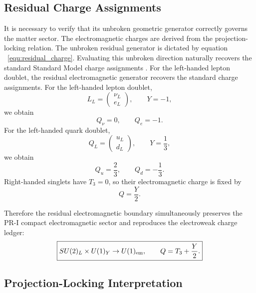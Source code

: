 \documentclass[11pt]{article}
\begin{document}
\subsection{Residual Charge Assignments}
\label{sec:pr2_residual_charge_assignments}
It is necessary to verify that its unbroken geometric generator correctly governs the matter sector. The electromagnetic charges are derived from the projection-locking relation. The unbroken residual generator is dictated by equation ~\ref{equ:residual_charge}. Evaluating this unbroken direction naturally recovers the standard Standard Model charge assignments \cite{PDG2024}. For the left-handed lepton doublet, the residual electromagnetic generator recovers the standard charge assignments. For the left-handed lepton doublet,
\begin{equation}
\boxed{
L_L
=
\begin{pmatrix}
\nu_L\\
e_L
\end{pmatrix},
\qquad
Y=-1,
}
\end{equation}
we obtain
\begin{equation}
Q_{\nu}=0,
\qquad
Q_e=-1.
\end{equation}
For the left-handed quark doublet,
\begin{equation}
\boxed{
Q_L
=
\begin{pmatrix}
u_L\\
d_L
\end{pmatrix},
\qquad
Y=\frac13,
}
\end{equation}
we obtain
\begin{equation}
Q_u=\frac23,
\qquad
Q_d=-\frac13.
\end{equation}
Right-handed singlets have \(T_3=0\), so their electromagnetic charge is fixed by
\begin{equation}
\boxed{
Q=\frac{Y}{2}.
}
\end{equation}

Therefore the residual electromagnetic boundary simultaneously preserves the PR-I compact electromagnetic sector and reproduces the electroweak charge ledger:
\begin{equation}
\boxed{
SU(2)_L\times U(1)_Y
\rightarrow
U(1)_{\rm em},
\qquad
Q=T_3+\frac{Y}{2}.
}
\end{equation}

\subsection{Projection-Locking Interpretation}
\label{sec:pr2_projection_locking_interpretation}
\end{document}
